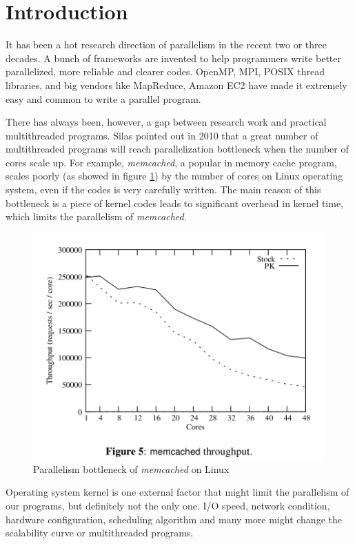 \section{Introduction}

It has been a hot research direction of parallelism in the recent two or 
three decades. A bunch of frameworks are invented to help programmers 
write better parallelized, more reliable and clearer codes. OpenMP, MPI, 
POSIX thread libraries, and big vendors like MapReduce, Amazon EC2 have made
it extremely easy and common to write a parallel program. 

There has always been, however, a gap between research work and practical 
multithreaded programs. Silas pointed out in 2010 that a great number of 
multithreaded programs will reach parallelization bottleneck when the 
number of cores scale up. For example, \emph{memcached}, a popular in 
memory cache program, scales poorly (as showed in figure 
\ref{figure:memcached})
by the number of cores on Linux 
operating system, even if the codes is very carefully written. The main 
reason of this bottleneck is a piece of kernel codes leads to significant 
overhead in kernel time, which limits the parallelism of \emph{memcached}.
\begin{figure}[H]
\center
\includegraphics[width=0.8\linewidth]{figures/memcachced_scal.png}
\caption{Parallelism bottleneck of \emph{memcached} on Linux} 
\label{figure:memcached}
\end{figure}
Operating system kernel is one external factor that might limit the 
parallelism of our programs, but definitely not the only one. I/O speed, 
network condition, hardware configuration, scheduling algorithm and many
more might change the scalability curve or multithreaded programs. 

